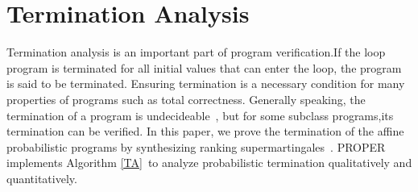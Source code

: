 \documentclass[sigconf,review, anonymous]{acmart}
\begin{document}
\section{Termination Analysis}
Termination analysis is an important part of program verification.If the loop program is terminated for all initial values that can enter the loop, the program is said to be terminated.  Ensuring termination is a necessary condition for many properties of programs such as total correctness. Generally speaking, the termination of a program is undecideable~\cite{Turing1936On}, but for some subclass programs,its termination can be verified. In this paper, we prove the termination of the affine probabilistic programs by synthesizing ranking supermartingales~\cite{Chakarov2013Martingales}. PROPER implements Algorithm \ref{TA}~\cite{cha2015algorithmic,kris2016termination}to analyze probabilistic termination qualitatively and quantitatively. 
\end{document}
